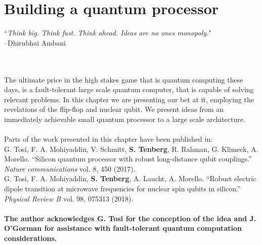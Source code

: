 
\chapter{Building a quantum processor} %

\label{Chapter4}

\noindent\hrulefill
\vspace{0.5cm} %
\begin{flushright}
        ``\emph{Think big. Think fast. Think ahead. Ideas are no ones monopoly.}"
\\ 
--Dhirubhai Ambani \\
\end{flushright}

\vspace{0.5cm}


\noindent\hrulefill
\vspace{0.5cm} %
\\
\hangindent=4cm
\\
The ultimate price in the high stakes game that is quantum computing these days, is a fault-tolerant large scale quantum computer, that is capable of solving relevant problems. In this chapter we are presenting our bet at it, employing the revelations of the flip-flop and nuclear qubit. We present ideas from an immediately achievable small quantum processor to a large scale architecture. 
\\ \\
\scriptsize
\hangindent=4cm
Parts of the work presented in this chapter have been published in:\\
G. Tosi, F. A. Mohiyaddin, V. Schmitt, \textbf{S. Tenberg}, R. Rahman,
G. Klimeck, A. Morello. ``Silicon quantum processor with robust long-distance qubit couplings.'' \textit{Nature communications} vol. 8, 450 (2017).\\
G. Tosi, F. A. Mohiyaddin, \textbf{S. Tenberg}, A. Laucht, A. Morello. ``Robust electric dipole transition at microwave frequencies for nuclear spin qubits in silicon.'' \textit{Physical Review B} vol. 98, 075313 (2018).\\
\\
\footnotesize
\hangindent=4cm
\textbf{The author acknowledges G. Tosi for the conception of the idea and J. O'Gorman for assistance with fault-tolerant quantum computation considerations. }\\

